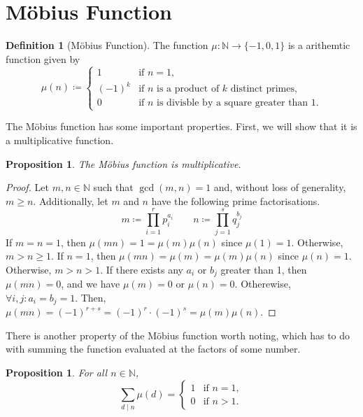 \documentclass[a4paper]{article}
\newtheorem{proposition}[theorem]{Proposition}
\theoremstyle{definition}
\newtheorem{definition}{Definition}
\begin{document}
\section{M\"obius Function}

\begin{definition}[M\"obius Function]
    The function $\mu\colon \mathbb{N} \to \{-1, 0, 1\}$ is a arithemtic function given by
    \begin{equation}
        \mu(n) \coloneq
        \begin{cases}
            1      & \text{if } n = 1,                                            \\
            (-1)^k & \text{if } n \text{ is a product of $k$ distinct primes,}    \\
            0      & \text{if } n \text{ is divisble by a square greater than 1.}
        \end{cases}
    \end{equation}
\end{definition}
The M\"obius function has some important properties.
First, we will show that it is a multiplicative function.
\begin{proposition}
    The M\"obius function is multiplicative.
\end{proposition}
\begin{proof}
    Let $m,n \in \mathbb{N}$ such that $\gcd(m,n) = 1$ and, without loss of generality, $m \geq n$.
    Additionally, let $m$ and $n$ have the following prime factorisations.
    \begin{equation*}
        m \coloneq \prod_{i=1}^r p_i^{a_i} \qquad n \coloneq \prod_{j=1}^s q_j^{b_j}
    \end{equation*}
    If $m = n = 1$, then $\mu(mn) = 1 = \mu(m)\mu(n)$ since $\mu(1) = 1$.
    Otherwise, $m > n \geq 1$.
    If $n = 1$, then $\mu(mn) = \mu(m) = \mu(m)\mu(n)$ since $\mu(n) = 1$.
    Otherwise, $m > n > 1$.
    If there exists any $a_i$ or $b_j$ greater than 1, then $\mu(mn) = 0$, and we have $\mu(m) = 0$ or $\mu(n) = 0$.
    Otherewise, $\forall i, j\colon a_i = b_j = 1$.
    Then, $\mu(mn) = (-1)^{r+s} = (-1)^r \cdot (-1)^s = \mu(m)\mu(n)$.
\end{proof}
There is another property of the M\"obius function worth noting, which has to do with summing the function evaluated at the factors of some number.
\begin{proposition}
    For all $n \in \mathbb{N}$,
    \begin{equation}
        \sum_{d \mid n} \mu (d) = \begin{cases}
            1 & \text{if } n = 1, \\
            0 & \text{if } n > 1.
        \end{cases}
    \end{equation}
\end{proposition}
\end{document}

